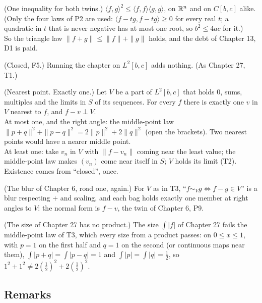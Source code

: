 \begin{lines}
\item[\lab{T1}] (One inequality for both twins.) $\langle f, g \rangle^2 \le \langle f, f \rangle \langle g, g \rangle$, on $\mathbb{R}^n$ and on $C[b,c]$ alike. \\
(Only the four laws of P2 are used: $\langle f - t g, f - t g \rangle \ge 0$ for every real $t$; a quadratic in $t$ that is never negative has at most one root, so $b^2 \le 4ac$ for it.) \\
So the triangle law $\|f + g\| \le \|f\| + \|g\|$ holds, and the debt of Chapter 13, D1 is paid.
\item[\lab{T2}] (Closed, F5.) Running the chapter on $L^2[b,c]$ adds nothing. (As Chapter 27, T1.)
\item[\lab{T3}] (Nearest point. Exactly one.) Let $V$ be a part of $L^2[b,c]$ that holds $0$, sums, multiples and the limits in $S$ of its sequences. For every $f$ there is exactly one $v$ in $V$ nearest to $f$, and $f - v \perp V$. \\
At most one, and the right angle: the middle-point law $\|p + q\|^2 + \|p - q\|^2 = 2\|p\|^2 + 2\|q\|^2$ (open the brackets). Two nearest points would have a nearer middle point. \\
At least one: take $v_n$ in $V$ with $\|f - v_n\|$ coming near the least value; the middle-point law makes $(v_n)$ come near itself in $S$; $V$ holds its limit (T2). Existence comes from ``closed'', once.
\item[\lab{T4}] (The blur of Chapter 6, road one, again.) For $V$ as in T3, ``$f \sim_V g \iff f - g \in V$'' is a blur respecting $+$ and scaling, and each bag holds exactly one member at right angles to $V$: the normal form is $f - v$, the twin of Chapter 6, P9.
\item[\lab{T5}] (The size of Chapter 27 has no product.) The size $\int |f|$ of Chapter 27 fails the middle-point law of T3, which every size from a product passes: on $0 \le x \le 1$, with $p = 1$ on the first half and $q = 1$ on the second (or continuous maps near them), $\int|p + q| = \int |p - q| = 1$ and $\int|p| = \int|q| = \tfrac12$, so $1^2 + 1^2 \ne 2 (\tfrac12)^2 + 2 (\tfrac12)^2$.
\end{lines}

\subsection*{Remarks}

